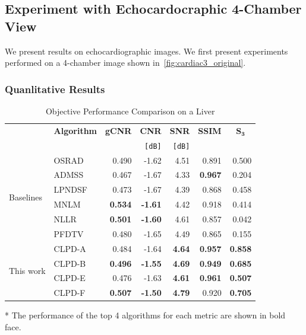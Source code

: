\subsection{Experiment with Echocardocraphic 4-Chamber View}
We present results on echocardiographic images.
We first present experiments performed on a 4-chamber image shown in~\cref{fig:cardiac3_original}.

\subsubsection{Quanlitative Results}

\begin{table}
  \centering
  \caption{Objective Performance Comparison on a Liver}
  \begin{threeparttable}
  \begin{tabular}{llrrrrr}
    \toprule
    & \multicolumn{1}{c}{\textbf{Algorithm}}
    & \multicolumn{1}{c}{\textbf{gCNR}}
    & \multicolumn{1}{c}{\textbf{CNR}}
    & \multicolumn{1}{c}{\textbf{SNR}}
    & \multicolumn{1}{c}{\textbf{SSIM}}
    & \multicolumn{1}{c}{\(\mathbf{S_{3}}\)}\\
    & \multicolumn{1}{c}{}
    & \multicolumn{1}{c}{}
    & \texttt{[dB]}
    & \texttt{[dB]}
    & \multicolumn{1}{c}{}
    & \multicolumn{1}{c}{} \\\midrule
    \multirow{6}{*}{Baselines}
    & OSRAD  & 0.490          & -1.62          & 4.51          & 0.891          & 0.500 \\
    & ADMSS  & 0.467          & -1.67          & 4.33          & \textbf{0.967} & 0.204 \\
    & LPNDSF & 0.473          & -1.67          & 4.39          & 0.868          & 0.458 \\
    & MNLM   & \textbf{0.534} & \textbf{-1.61} & 4.42          & 0.918          & 0.414 \\
    & NLLR   & \textbf{0.501} & \textbf{-1.60} & 4.61          & 0.857          & 0.042\\
    & PFDTV  & 0.480          & -1.65          & 4.49          & 0.865          & 0.155 \\\midrule
    \multirow{4}{*}{This work}
    & CLPD-A & 0.484          & -1.64          & \textbf{4.64} & \textbf{0.957} & \textbf{0.858} \\
    & CLPD-B & \textbf{0.496} & \textbf{-1.55} & \textbf{4.69} & \textbf{0.949} & \textbf{0.685} \\
    & CLPD-E & 0.476          & -1.63          & \textbf{4.61} & \textbf{0.961} & \textbf{0.507} \\
    & CLPD-F & \textbf{0.507} & \textbf{-1.50} & \textbf{4.79} & 0.920          & \textbf{0.705} \\\bottomrule
  \end{tabular}
  \begin{tablenotes}
    \item[*] The performance of the top 4 algorithms for each metric are shown in bold face.
  \end{tablenotes}
  \end{threeparttable}
\end{table}
%
